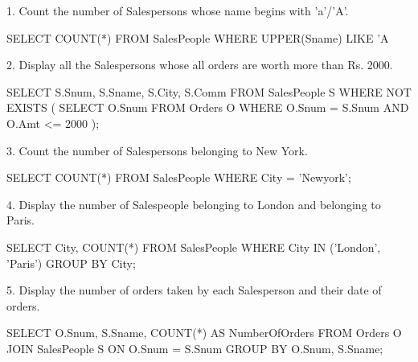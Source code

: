 1. Count the number of Salespersons whose name begins with 'a'/'A'.


SELECT COUNT(*)
FROM SalesPeople
WHERE UPPER(Sname) LIKE 'A%

2. Display all the Salespersons whose all orders are worth more than Rs. 2000.


SELECT S.Snum, S.Sname, S.City, S.Comm
FROM SalesPeople S
WHERE NOT EXISTS (
    SELECT O.Snum
    FROM Orders O
    WHERE O.Snum = S.Snum
    AND O.Amt <= 2000
);


3. Count the number of Salespersons belonging to New York.


SELECT COUNT(*)
FROM SalesPeople
WHERE City = 'Newyork';


4. Display the number of Salespeople belonging to London and belonging to Paris.


SELECT City, COUNT(*)
FROM SalesPeople
WHERE City IN ('London', 'Paris')
GROUP BY City;


5. Display the number of orders taken by each Salesperson and their date of orders.


SELECT O.Snum, S.Sname, COUNT(*) AS NumberOfOrders
FROM Orders O
JOIN SalesPeople S ON O.Snum = S.Snum
GROUP BY O.Snum, S.Sname;